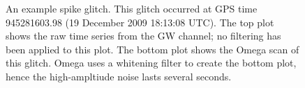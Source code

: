 \begin{figure}[hp]
\center
{}
\label{fig:spike_glitch-example}
\caption{An example spike glitch. This glitch occurred at GPS time 945281603.98 (19 December 2009 18:13:08 UTC). The top plot shows the raw time series from the \ac{GW} channel; no filtering has been applied to this plot. The bottom plot shows the Omega scan of this glitch. Omega uses a whitening filter to create the bottom plot, hence the high-ampltiude noise lasts several seconds.}
\end{figure}

